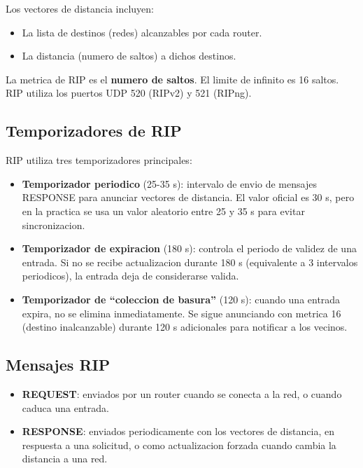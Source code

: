 Los vectores de distancia incluyen:
\begin{itemize}
    \item La lista de destinos (redes) alcanzables por cada router.
    \item La distancia (numero de saltos) a dichos destinos.
\end{itemize}

La metrica de RIP es el \textbf{numero de saltos}. El limite de infinito es 16 saltos.
RIP utiliza los puertos UDP 520 (RIPv2) y 521 (RIPng).

\subsection{Temporizadores de RIP}

RIP utiliza tres temporizadores principales:

\begin{itemize}
    \item \textbf{Temporizador periodico} (25-35 s): intervalo de envio de mensajes
    RESPONSE para anunciar vectores de distancia. El valor oficial es 30 s, pero
    en la practica se usa un valor aleatorio entre 25 y 35 s para evitar
    sincronizacion.
    \item \textbf{Temporizador de expiracion} (180 s): controla el periodo de validez
    de una entrada. Si no se recibe actualizacion durante 180 s (equivalente a
    3 intervalos periodicos), la entrada deja de considerarse valida.
    \item \textbf{Temporizador de ``coleccion de basura''} (120 s): cuando una entrada
    expira, no se elimina inmediatamente. Se sigue anunciando con metrica 16
    (destino inalcanzable) durante 120 s adicionales para notificar a los vecinos.
\end{itemize}

\subsection{Mensajes RIP}

\begin{itemize}
    \item \textbf{REQUEST}: enviados por un router cuando se conecta a la red, o cuando
    caduca una entrada.
    \item \textbf{RESPONSE}: enviados periodicamente con los vectores de distancia, en
    respuesta a una solicitud, o como actualizacion forzada cuando cambia la
    distancia a una red.
\end{itemize}

